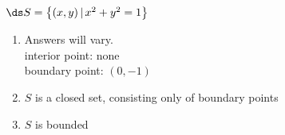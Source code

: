 {$\ds S = \left\{(x,y)\,| \,  x^2+y^2=1\right\}$}
{\begin{enumerate}
\item Answers will vary.\\
interior point: none\\
boundary point: $(0,-1)$\\
\item $S$ is a closed set, consisting only of boundary points\\
\item $S$ is bounded
\end{enumerate}
}